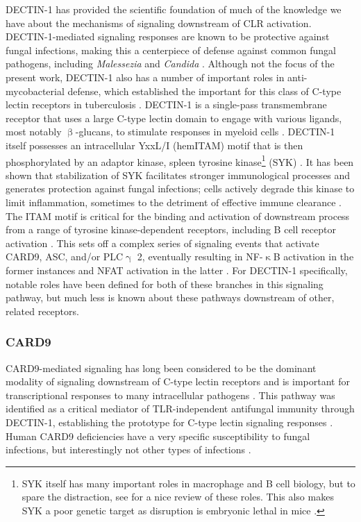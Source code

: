 DECTIN\hyp{}1 has provided the scientific foundation of much of the knowledge we have about the mechanisms of signaling downstream of CLR activation. DECTIN\hyp{}1\hyp{}mediated signaling responses are known to be protective against fungal infections, making this a centerpiece of defense against common fungal pathogens, including \textit{Malessezia} and \textit{Candida} \citep{Shiokawa2017}. Although not the focus of the present work, DECTIN\hyp{}1 also has a number of important roles in anti\hyp{}mycobacterial defense, which established the important for this class of C\hyp{}type lectin receptors in tuberculosis \citep{Yadav2006}. DECTIN\hyp{}1 is a single\hyp{}pass transmembrane receptor that uses a large C\hyp{}type lectin domain to engage with various ligands, most notably $\upbeta$\hyp{}glucans, to stimulate responses in myeloid cells \citep{Brown2007}. DECTIN\hyp{}1 itself possesses an intracellular YxxL/I (hemITAM) motif that is then phosphorylated by an adaptor kinase, spleen tyrosine kinase\footnote{SYK itself has many important roles in macrophage and B cell biology, but to spare the distraction, see \citet{Mocsai2010} for a nice review of these roles. This also makes SYK a poor genetic target as disruption is embryonic lethal in mice \citep{Yanagi2001}.} (SYK) \citep{Getahun2015, Kerrigan2011, Bauer2017}. It has been shown that stabilization of SYK facilitates stronger immunological processes and generates protection against fungal infections; cells actively degrade this kinase to limit inflammation, sometimes to the detriment of effective immune clearance \citep{Wirnsberger2016}. The ITAM motif is critical for the binding and activation of downstream process from a range of tyrosine kinase\hyp{}dependent receptors, including B cell receptor activation \citep{Monroe2006, Bauer2017}. This sets off a complex series of signaling events that activate CARD9, ASC, and/or PLC$\upgamma$ 2, eventually resulting in NF\hyp{}$\upkappa$B activation in the former instances and NFAT activation in the latter \citep{Geijtenbeek2009, Drummond2013}. For DECTIN\hyp{}1 specifically, notable roles have been defined for both of these branches in this signaling pathway, but much less is known about these pathways downstream of other, related receptors.

\subsubsection{CARD9}\label{clr:card9}

CARD9\hyp{}mediated signaling has long been considered to be the dominant modality of signaling downstream of C\hyp{}type lectin receptors and is important for transcriptional responses to many intracellular pathogens \citep{Hsu2007, Hara2007}. This pathway was identified as a critical mediator of TLR\hyp{}independent antifungal immunity through DECTIN\hyp{}1, establishing the prototype for C\hyp{}type lectin signaling responses \citep{Gross2006}. Human CARD9 deficiencies have a very specific susceptibility to fungal infections, but interestingly not other types of infections \citep{Drummond2018, Drummond2016}.

